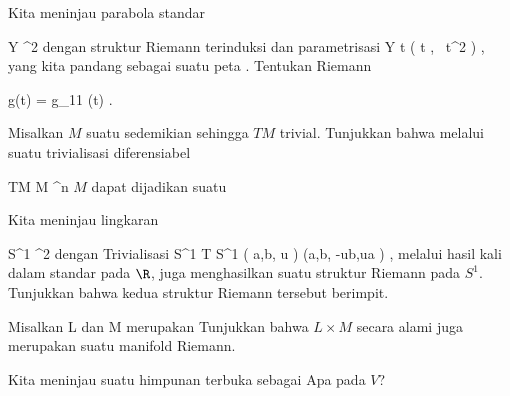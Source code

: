 \setcounter{section}{16}


{}
{

Kita meninjau parabola standar

\mavergleichskette
{\vergleichskette
{ Y
}
{ \subseteq }{ \R^2
}
{  }{
}
{    }{
}
{   }{
}
}
{}{}{}
dengan struktur Riemann terinduksi dan parametrisasi
\maabbeledisp {\varphi} {\R} { Y
} { t } { \left(  t   , \,  t^2                   \right)
} {,}
yang kita pandang sebagai suatu peta
 {} {.}
Tentukan
Riemann

\mavergleichskette
{\vergleichskette
{ g(t)
}
{ = }{ g_{11} (t)
}
{  }{
}
{    }{
}
{   }{
}
}
{}{}{.}

}
{} {}

{}
{

Misalkan $M$ suatu
sedemikian sehingga
$TM$ trivial. Tunjukkan bahwa melalui suatu trivialisasi diferensiabel

\mavergleichskette
{\vergleichskette
{ TM
}
{ \cong }{ M \times \R^n
}
{  }{
}
{    }{
}
{   }{
}
}
{}{}{}
 {} {}
$M$ dapat dijadikan suatu

}
{} {}

{}
{

Kita meninjau lingkaran

\mavergleichskette
{\vergleichskette
{ S^1
}
{ \subseteq }{ \R^2
}
{  }{
}
{    }{
}
{   }{
}
}
{}{}{}
dengan
Trivialisasi
\maabbeledisp {} { S^1 \times \R } { T S^1
} {( a,b, u )} { (a,b, -ub,ua )
} {,}
melalui hasil kali dalam standar pada $\R$, juga menghasilkan suatu struktur Riemann pada $S^1$. Tunjukkan bahwa kedua struktur Riemann tersebut berimpit.

}
{} {}

{}
{

Misalkan
\mathkor {} {L} {dan} {M} {}
merupakan
Tunjukkan bahwa $L \times M$ secara alami juga merupakan suatu manifold Riemann.

}
{} {}

{}
{

Kita meninjau suatu himpunan terbuka
 sebagai
 Apa
 pada $V$?

}
{} {}

